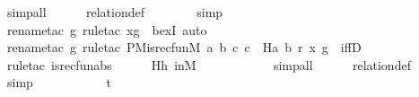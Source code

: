 \begin{isabellebody}
\ simp{\isacharunderscore}{\kern0pt}all\isanewline
\ \ \ \ \isamarkupfalse%
\ relation{}{\isacharunderscore}{\kern0pt}def\ \isanewline
\ \ \ \ \ \isamarkupfalse%
\ simp\isanewline
\ \ \ \ \isamarkupfalse%
\ {\isacharparenleft}{\kern0pt}rename{\isacharunderscore}{\kern0pt}tac\ g{\isacharcomma}{\kern0pt}\ rule{\isacharunderscore}{\kern0pt}tac\ x{\isacharequal}{\kern0pt}{\isachardoublequoteopen}g{\isachardoublequoteclose}\ \ bexI{\isacharsemicolon}{\kern0pt}\ auto{\isacharparenright}{\kern0pt}\isanewline
\ \ \ \ \isamarkupfalse%
\ {\isacharparenleft}{\kern0pt}rename{\isacharunderscore}{\kern0pt}tac\ g{\isacharcomma}{\kern0pt}\ rule{\isacharunderscore}{\kern0pt}tac\ P{\isacharequal}{\kern0pt}{\isachardoublequoteopen}M{\isacharunderscore}{\kern0pt}is{\isacharunderscore}{\kern0pt}recfun{\isacharparenleft}{\kern0pt}{\isacharhash}{\kern0pt}{\isacharhash}{\kern0pt}M{\isacharcomma}{\kern0pt}\ {\isasymlambda}a\ b\ c{\isachardot}{\kern0pt}\ c\ {\isacharequal}{\kern0pt}\ H{\isacharparenleft}{\kern0pt}a{\isacharcomma}{\kern0pt}\ b{\isacharparenright}{\kern0pt}{\isacharcomma}{\kern0pt}\ r{\isacharcomma}{\kern0pt}\ x{\isacharcomma}{\kern0pt}\ g{\isacharparenright}{\kern0pt}{\isachardoublequoteclose}\ \ iffD{}{\isacharparenright}{\kern0pt}\isanewline
\ \ \ \ \ \isamarkupfalse%
\ {\isacharparenleft}{\kern0pt}rule{\isacharunderscore}{\kern0pt}tac\ is{\isacharunderscore}{\kern0pt}recfun{\isacharunderscore}{\kern0pt}abs{\isacharparenright}{\kern0pt}\isanewline
\ \ \ \ \isamarkupfalse%
\ Hh\ inM\ \isanewline
\ \ \ \ \ \ \ \ \ \isamarkupfalse%
\ simp{\isacharunderscore}{\kern0pt}all\isanewline
\ \ \ \ \isamarkupfalse%
\ relation{}{\isacharunderscore}{\kern0pt}def\ \isanewline
\ \ \ \ \isamarkupfalse%
\ simp\ \isanewline
\ \ \ \ \isamarkupfalse%
\ \isanewline
\ \ \isamarkupfalse%
\ t{}\ {\isacharcolon}{\kern0pt}\ \ \ \isanewline

\end{isabellebody}
